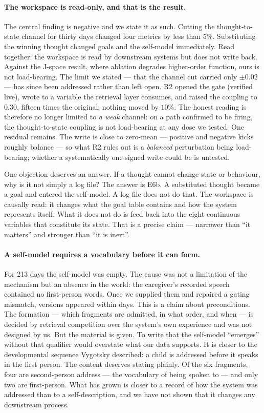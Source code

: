 \documentclass[11pt]{article}
\begin{document}
\paragraph{The workspace is read-only, and that is the result.}
The central finding is negative and we state it as such. Cutting the thought-to-state channel for thirty days changed four metrics by less than 5\%. Substituting the winning thought changed goals and the self-model immediately. Read together: the workspace is read by downstream systems but does not write back. Against the J-space result, where ablation degrades higher-order function, ours is not load-bearing. The limit we stated --- that the channel cut carried only $\pm0.02$ --- has since been addressed rather than left open. R2 opened the gate (verified live), wrote to a variable the retrieval layer consumes, and raised the coupling to $0.30$, fifteen times the original; nothing moved by $10\%$. The honest reading is therefore no longer limited to \emph{a weak} channel: on a path confirmed to be firing, the thought-to-state coupling is not load-bearing at any dose we tested. One residual remains. The write is close to zero-mean --- positive and negative kicks roughly balance --- so what R2 rules out is a \emph{balanced} perturbation being load-bearing; whether a systematically one-signed write could be is untested.

One objection deserves an answer. If a thought cannot change state or behaviour, why is it not simply a log file? The answer is E6b. A substituted thought became a goal and entered the self-model. A log file does not do that. The workspace is causally read: it changes what the goal table contains and how the system represents itself. What it does not do is feed back into the eight continuous variables that constitute its state. That is a precise claim --- narrower than ``it matters'' and stronger than ``it is inert''.

\paragraph{A self-model requires a vocabulary before it can form.}
For 213 days the self-model was empty. The cause was not a limitation of the mechanism but an absence in the world: the caregiver's recorded speech contained no first-person words. Once we supplied them and repaired a gating mismatch, versions appeared within days. This is a claim about preconditions. The formation --- which fragments are admitted, in what order, and when --- is decided by retrieval competition over the system's own experience and was not designed by us. But the material is given. To write that the self-model ``emerges'' without that qualifier would overstate what our data supports. It is closer to the developmental sequence Vygotsky described: a child is addressed before it speaks in the first person. The content deserves stating plainly. Of the six fragments, four are second-person address --- the vocabulary of being spoken to --- and only two are first-person. What has grown is closer to a record of how the system was addressed than to a self-description, and we have not shown that it changes any downstream process.
\end{document}
